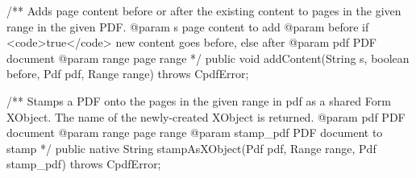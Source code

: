 /** Adds page content before or after the existing content to pages in the
given range in the given PDF.
@param s page content to add
@param before if <code>true</code> new content goes before, else after
@param pdf PDF document
@param range page range */
public void addContent(String s, boolean before, Pdf pdf, Range range)
    throws CpdfError;

/** Stamps a PDF onto the pages in the given range in pdf as a shared Form
XObject. The name of the newly-created XObject is returned.
@param pdf PDF document
@param range page range
@param stamp_pdf PDF document to stamp */
public native String stampAsXObject(Pdf pdf, Range range, Pdf stamp_pdf)
    throws CpdfError;
